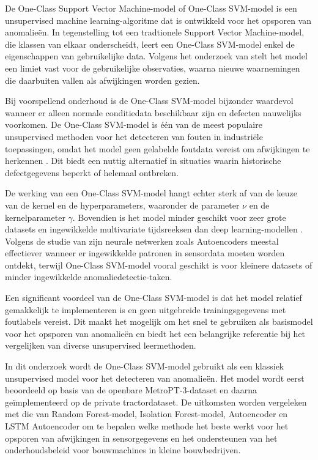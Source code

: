 {{{{{{{{De One-Class Support Vector Machine-model of One-Class SVM-model is een unsupervised machine learning-algoritme dat is ontwikkeld voor het opsporen van anomalieën. In tegenstelling tot een tradtionele Support Vector Machine-model, die klassen van elkaar onderscheidt, leert een One-Class SVM-model enkel de eigenschappen van gebruikelijke data. Volgens het onderzoek van \textcite{Carvalho2019} stelt het model een limiet vast voor de gebruikelijke observaties, waarna nieuwe waarnemingen die daarbuiten vallen als afwijkingen worden gezien.

Bij voorspellend onderhoud is de One-Class SVM-model bijzonder waardevol wanneer er alleen normale conditiedata beschikbaar zijn en defecten nauwelijks voorkomen. De One-Class SVM-model is één van de meest populaire unsupervised methoden voor het detecteren van fouten in industriële toepassingen, omdat het model geen gelabelde foutdata vereist om afwijkingen te herkennen \autocite{Carvalho2019}. Dit biedt een nuttig alternatief in situaties waarin historische defectgegevens beperkt of helemaal ontbreken.

De werking van een One-Class SVM-model hangt echter sterk af van de keuze van de kernel en de hyperparameters, waaronder de parameter $\nu$ en de kernelparameter $\gamma$. Bovendien is het model minder geschikt voor zeer grote datasets en ingewikkelde multivariate tijdsreeksen dan deep learning-modellen \autocite{Elahi2023}. Volgens de studie van \textcite{Giannoulidis2024} zijn neurale netwerken zoals Autoencoders meestal effectiever wanneer er ingewikkelde patronen in sensordata moeten worden ontdekt, terwijl One-Class SVM-model vooral geschikt is voor kleinere datasets of minder ingewikkelde anomaliedetectie-taken.

Een significant voordeel van de One-Class SVM-model is dat het model relatief gemakkelijk te implementeren is en geen uitgebreide trainingsgegevens met foutlabels vereist. Dit maakt het mogelijk om het snel te gebruiken als basismodel voor het opsporen van anomalieën en biedt het een belangrijke referentie bij het vergelijken van diverse unsupervised leermethoden.

In dit onderzoek wordt de One-Class SVM-model gebruikt als een klassiek unsupervised model voor het detecteren van anomalieën. Het model wordt eerst beoordeeld op basis van de openbare MetroPT-3-dataset en daarna geïmplementeerd op de private tractordataset. De uitkomsten worden vergeleken met die van Random Forest-model, Isolation Forest-model, Autoencoder en LSTM Autoencoder om te bepalen welke methode het beste werkt voor het opsporen van afwijkingen in sensorgegevens en het ondersteunen van het onderhoudsbeleid voor bouwmachines in kleine bouwbedrijven.
    
}}}}}}}}
